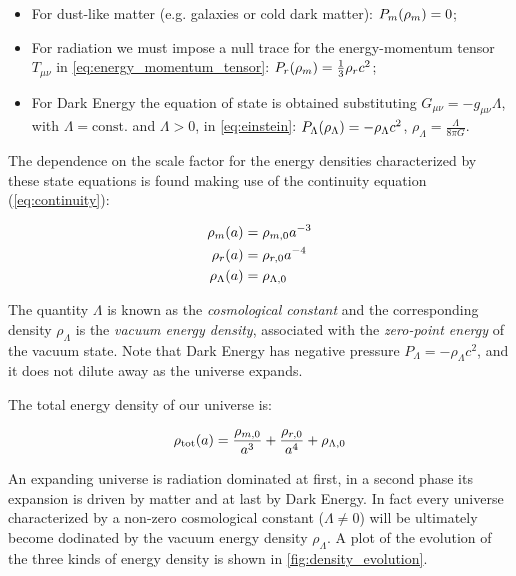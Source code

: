 \begin{itemize}
        \item For dust-like matter (e.g. galaxies or cold dark matter):
        $P_m\qty(\rho_m) = 0$;
        \item For radiation we must impose a null trace for the energy-momentum
        tensor $T_{\mu \nu}$ in \autoref{eq:energy_momentum_tensor}: $P_r\qty(\rho_m)
        = \frac{1}{3} \rho_r c^2$;
        \item For Dark Energy the equation of state is obtained
        substituting  $G_{\mu \nu} = -g_{\mu \nu} \Lambda$, with $\Lambda =
        \text{const.}$ and $\Lambda > 0$, in \autoref{eq:einstein}:
        $P_\Lambda\qty(\rho_\Lambda) = -\rho_\Lambda c^2$, $\rho_\Lambda =
        \frac{\Lambda}{8\pi G}$.
\end{itemize}

The dependence on the scale factor for the energy densities characterized by
these state equations is found making use of the continuity equation
(\autoref{eq:continuity}):

\begin{align}
        \rho_m\qty(a) & = \rho_{m,0}a^{-3} \label{eq:rho_m} \\
        \rho_r\qty(a) & = \rho_{r,0}a^{-4} \label{eq:rho_r} \\
        \rho_\Lambda\qty(a) & = \rho_{\Lambda,0} \label{eq:rho_lambda} \\
\end{align}

The quantity $\Lambda$ is known as the \emph{cosmological constant} and the
corresponding density $\rho_\Lambda$ is the \emph{vacuum energy density},
associated with the \emph{zero-point energy} of the vacuum state. Note that
Dark Energy has negative pressure $P_\Lambda = -\rho_\Lambda c^2$, and it
does not dilute away as the universe expands.

The total energy density of our universe is:

\begin{equation}
        \rho_\text{tot}\qty(a) = \frac{\rho_{m,0}}{a^3} + \frac{\rho_{r,0}}{a^4} +
        \rho_{\Lambda,0}
\end{equation}

An expanding universe is radiation dominated at first, in a second phase
its expansion is driven by matter and at last by Dark Energy. In fact every
universe characterized by a non-zero cosmological constant ($\Lambda \neq
0$) will be ultimately become dodinated by the vacuum energy density
$\rho_\Lambda$. A plot of the evolution of the three kinds of energy
density is shown in \autoref{fig:density_evolution}.

